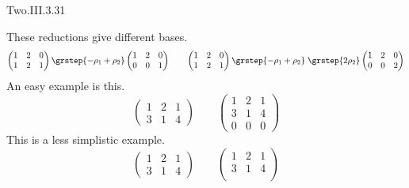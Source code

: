 \begin{ans}{Two.III.3.31}
      \begin{exparts}
        \partsitem These reductions give different bases.
          \begin{equation*}
            \begin{pmatrix}
              1  &2  &0  \\
              1  &2  &1
            \end{pmatrix}
            \grstep{-\rho_1+\rho_2}
            \begin{pmatrix}
              1  &2  &0  \\
              0  &0  &1
            \end{pmatrix}
            \qquad
            \begin{pmatrix}
              1  &2  &0  \\
              1  &2  &1
            \end{pmatrix}
            \grstep{-\rho_1+\rho_2}
            \;\grstep{2\rho_2}
            \begin{pmatrix}
              1  &2  &0  \\
              0  &0  &2
            \end{pmatrix}
          \end{equation*}
        \partsitem An easy example is this.
          \begin{equation*}
            \begin{pmatrix}
              1  &2  &1  \\
              3  &1  &4
            \end{pmatrix}
            \qquad
            \begin{pmatrix}
              1  &2  &1  \\
              3  &1  &4  \\
              0  &0  &0
            \end{pmatrix}
          \end{equation*}
          This is a less simplistic example.
          \begin{equation*}
            \begin{pmatrix}
              1  &2  &1  \\
              3  &1  &4
            \end{pmatrix}
            \qquad
            \begin{pmatrix}
              1  &2  &1  \\
              3  &1  &4  \\

\end{pmatrix}
\end{equation*}
\end{exparts}
\end{ans}
